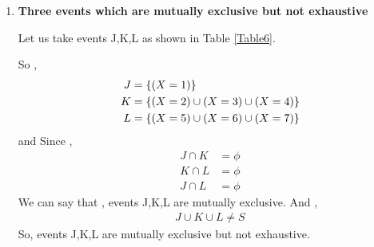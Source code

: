 \documentclass[journal,12pt,twocolumn]{IEEEtran}
\begin{document}
\begin{enumerate}[label=(\roman*)]
    \item \textbf{Three events which are mutually exclusive but not exhaustive}
    
    Let us take events J,K,L as shown in Table \ref{Table6}.
    \begin{table}[ht!]
        
        \caption{}
        \label{Table6}
    \end{table}
    So ,
    \begin{align}
        J &= \left\{ (X=1) \right\} \\
        K &= \left\{ (X=2) \cup (X=3) \cup (X=4) \right\} \\
        L &= \left\{ (X=5) \cup (X=6) \cup (X=7) \right\}
    \end{align}
    and Since , 
    \begin{align}
        J \cap K &= \phi \\
        K \cap L &= \phi \\
        J \cap L &= \phi
    \end{align}
    We can say that , events J,K,L are mutually exclusive. And ,
    \begin{align}
        J \cup K \cup L \neq S 
    \end{align}  
    So, events J,K,L are mutually exclusive but not exhaustive.
    
\end{enumerate}
\end{document}
